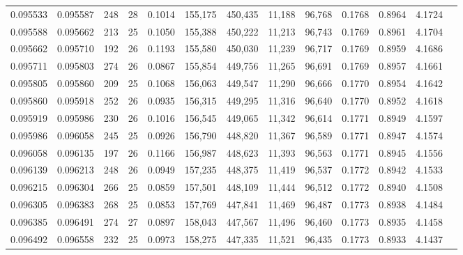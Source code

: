 \begin{tabular}{rrrrrrrrrrrrr}
0.095533 & 0.095587 & 248 &  28 &                                     0.1014 & 155,175 & 450,435 &  11,188 &  96,768 & 0.1768 & 0.8964 & 4.1724 \\
0.095588 & 0.095662 & 213 &  25 &                                     0.1050 & 155,388 & 450,222 &  11,213 &  96,743 & 0.1769 & 0.8961 & 4.1704 \\
0.095662 & 0.095710 & 192 &  26 &                                     0.1193 & 155,580 & 450,030 &  11,239 &  96,717 & 0.1769 & 0.8959 & 4.1686 \\
0.095711 & 0.095803 & 274 &  26 &                                     0.0867 & 155,854 & 449,756 &  11,265 &  96,691 & 0.1769 & 0.8957 & 4.1661 \\
0.095805 & 0.095860 & 209 &  25 &                                     0.1068 & 156,063 & 449,547 &  11,290 &  96,666 & 0.1770 & 0.8954 & 4.1642 \\
0.095860 & 0.095918 & 252 &  26 &                                     0.0935 & 156,315 & 449,295 &  11,316 &  96,640 & 0.1770 & 0.8952 & 4.1618 \\
0.095919 & 0.095986 & 230 &  26 &                                     0.1016 & 156,545 & 449,065 &  11,342 &  96,614 & 0.1771 & 0.8949 & 4.1597 \\
0.095986 & 0.096058 & 245 &  25 &                                     0.0926 & 156,790 & 448,820 &  11,367 &  96,589 & 0.1771 & 0.8947 & 4.1574 \\
0.096058 & 0.096135 & 197 &  26 &                                     0.1166 & 156,987 & 448,623 &  11,393 &  96,563 & 0.1771 & 0.8945 & 4.1556 \\
0.096139 & 0.096213 & 248 &  26 &                                     0.0949 & 157,235 & 448,375 &  11,419 &  96,537 & 0.1772 & 0.8942 & 4.1533 \\
0.096215 & 0.096304 & 266 &  25 &                                     0.0859 & 157,501 & 448,109 &  11,444 &  96,512 & 0.1772 & 0.8940 & 4.1508 \\
0.096305 & 0.096383 & 268 &  25 &                                     0.0853 & 157,769 & 447,841 &  11,469 &  96,487 & 0.1773 & 0.8938 & 4.1484 \\
0.096385 & 0.096491 & 274 &  27 &                                     0.0897 & 158,043 & 447,567 &  11,496 &  96,460 & 0.1773 & 0.8935 & 4.1458 \\
0.096492 & 0.096558 & 232 &  25 &                                     0.0973 & 158,275 & 447,335 &  11,521 &  96,435 & 0.1773 & 0.8933 & 4.1437 \\

\end{tabular}
